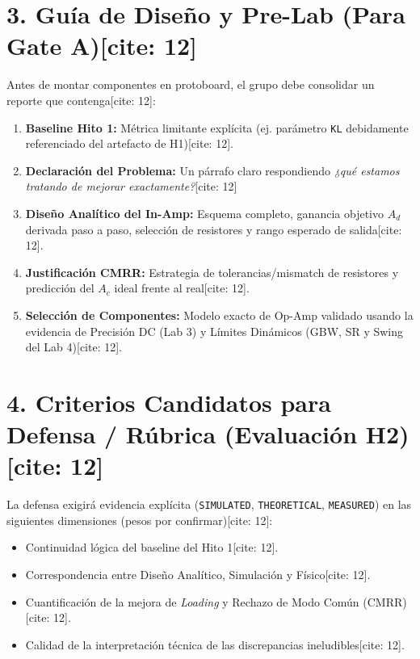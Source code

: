 \documentclass[11pt, a4paper]{article}
\begin{document}
\section*{3. Guía de Diseño y Pre-Lab (Para Gate A)[cite: 12]}
Antes de montar componentes en protoboard, el grupo debe consolidar un reporte que contenga[cite: 12]:
\begin{enumerate}
    \item \textbf{Baseline Hito 1:} Métrica limitante explícita (ej. parámetro \texttt{KL} debidamente referenciado del artefacto de H1)[cite: 12].
    \item \textbf{Declaración del Problema:} Un párrafo claro respondiendo \textit{¿qué estamos tratando de mejorar exactamente?}[cite: 12]
    \item \textbf{Diseño Analítico del In-Amp:} Esquema completo, ganancia objetivo $A_d$ derivada paso a paso, selección de resistores y rango esperado de salida[cite: 12].
    \item \textbf{Justificación CMRR:} Estrategia de tolerancias/mismatch de resistores y predicción del $A_c$ ideal frente al real[cite: 12].
    \item \textbf{Selección de Componentes:} Modelo exacto de Op-Amp validado usando la evidencia de Precisión DC (Lab 3) y Límites Dinámicos (GBW, SR y Swing del Lab 4)[cite: 12].
\end{enumerate}

\section*{4. Criterios Candidatos para Defensa / Rúbrica (Evaluación H2)[cite: 12]}
La defensa exigirá evidencia explícita (\texttt{SIMULATED}, \texttt{THEORETICAL}, \texttt{MEASURED}) en las siguientes dimensiones (pesos por confirmar)[cite: 12]:
\begin{itemize}
    \setlength{\itemsep}{0pt}
    \item Continuidad lógica del baseline del Hito 1[cite: 12].
    \item Correspondencia entre Diseño Analítico, Simulación y Físico[cite: 12].
    \item Cuantificación de la mejora de \textit{Loading} y Rechazo de Modo Común (CMRR)[cite: 12].
    \item Calidad de la interpretación técnica de las discrepancias ineludibles[cite: 12].
\end{itemize}
\end{document}

